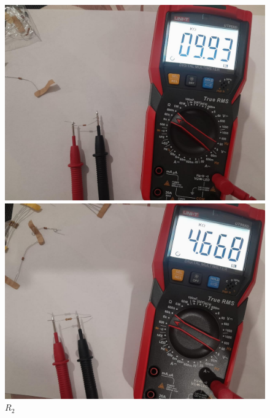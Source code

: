 \documentclass[a4paper,12pt]{article}
\begin{document}
\begin{itemize}
\begin{figure}[H]
    \centering
    \begin{minipage}{0.35\textwidth}
        \centering
        \includegraphics[width=\linewidth]{imagenes/r1.jpg}
        \caption*{$R_1$}
    \end{minipage}
    \hfill
    \begin{minipage}{0.35\textwidth}
        \centering
        \includegraphics[width=\linewidth]{imagenes/r2.jpg}
        \caption*{$R_2$}
    \end{minipage}
    \hfill
    \begin{minipage}{0.35\textwidth}
        \centering

\end{minipage}
\end{figure}
\end{itemize}
\end{document}
